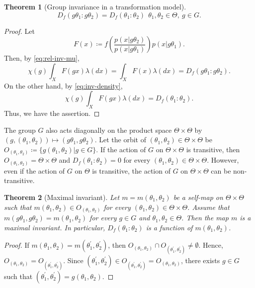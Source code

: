 \documentclass[a4paper, reqno, 11pt]{article}
\newtheorem{Thm}{Theorem}[section]
\theoremstyle{definition}
\begin{document}
\begin{Thm}[Group invariance in a transformation model]\label{thm:inv-div}
\[ D_f (g\theta_1 \colon g\theta_2)  = D_f (\theta_1 \colon \theta_2)  \ \  \theta_1, \theta_2 \in \Theta, \ g \in G. \]
\end{Thm}

\begin{proof}
Let 
\[ F(x) \coloneqq   f \left( \frac{p(x|g\theta_2)}{p(x|g\theta_1)} \right) p(x|g\theta_1).  \]
Then, by \eqref{eq:rel-inv-mu}, 
\[ \chi(g) \int_{X} F(gx) \lambda(dx) = \int_{X} F(x) \lambda(dx) =  D_f (g\theta_1 \colon g\theta_2). \]
On the other hand, by \eqref{eq:inv-density}, 
\[ \chi(g) \int_{X} F(gx) \lambda(dx) =  D_f (\theta_1 \colon \theta_2). \]
Thus, we have the assertion. 
\end{proof}

The group $G$ also acts diagonally on the product space $\Theta \times \Theta$ by $(g, (\theta_1, \theta_2)) \mapsto (g\theta_1, g\theta_2)$. 
Let the orbit of $(\theta_1, \theta_2) \in \Theta \times \Theta$ be $O_{(\theta_1, \theta_2)} \coloneqq   \{g(\theta_1, \theta_2) | g \in G\}$. 
If  the action of $G$ on $\Theta \times \Theta$ is transitive, 
then  $O_{(\theta_1, \theta_2)} = \Theta \times \Theta$ and $D_f (\theta_1 \colon \theta_2) = 0$ for every $(\theta_1, \theta_2) \in \Theta \times \Theta$.  
However, even if the action of $G$ on $\Theta$ is transitive,  the action of $G$ on $\Theta \times \Theta$ can be non-transitive. 


\begin{Thm}[Maximal invariant]\label{thm:abstract}
Let $m = m(\theta_1, \theta_2)$ be a self-map on $\Theta \times \Theta$ such that 
$m(\theta_1, \theta_2) \in O_{(\theta_1, \theta_2)}$ for every $(\theta_1, \theta_2) \in \Theta \times \Theta$. 
Assume that $m(g\theta_1, g\theta_2) = m(\theta_1, \theta_2)$ for every $g \in G$ and $\theta_1, \theta_2 \in \Theta$. 
Then the map $m$ is a maximal invariant. 
In particular, 
$D_f (\theta_1 \colon \theta_2) $ is a function of $m(\theta_1, \theta_2)$. 
\end{Thm}


\begin{proof}
If $m(\theta_1, \theta_2) = m(\theta_1^{\prime}, \theta_2^{\prime})$, then 
$O_{(\theta_1, \theta_2)} \cap O_{(\theta_1^{\prime}, \theta_2^{\prime})} \ne \emptyset$. 
Hence, 
$O_{(\theta_1, \theta_2)} = O_{(\theta_1^{\prime}, \theta_2^{\prime})}$. 
Since $(\theta_1^{\prime}, \theta_2^{\prime}) \in  O_{(\theta_1^{\prime}, \theta_2^{\prime})} = O_{(\theta_1, \theta_2)}$, 
there exists $g \in G$ such that $(\theta_1^{\prime}, \theta_2^{\prime}) = g(\theta_1, \theta_2)$. 
\end{proof}
\end{document}
